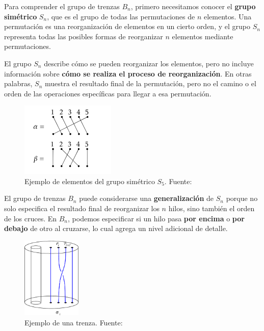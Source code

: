 Para comprender el grupo de trenzas \( B_n \), primero necesitamos conocer el \textbf{grupo simétrico} \( S_n \), que es el grupo de todas las permutaciones de \( n \) elementos. Una permutación es una reorganización de elementos en un cierto orden, y el grupo \( S_n \) representa todas las posibles formas de reorganizar \( n \) elementos mediante permutaciones.

El grupo \( S_n \) describe cómo se pueden reorganizar los elementos, pero no incluye información sobre \textbf{cómo se realiza el proceso de reorganización}. En otras palabras, \( S_n \) muestra el resultado final de la permutación, pero no el camino o el orden de las operaciones específicas para llegar a esa permutación.

\begin{figure}[h!]
    \centering
    \includegraphics[width=0.4\textwidth]{figures/chapters/1_def_grupo/symmetric_group.png}
    \caption{Ejemplo de elementos del grupo simétrico $S_5$. Fuente: \cite{ernst_43_2022}}
    \label{fig:ciclo_5}
\end{figure}

\bigskip

El grupo de trenzas \( B_n \) puede considerarse una \textbf{generalización} de \( S_n \) porque no solo especifica el resultado final de reorganizar los \( n \) hilos, sino también el orden de los cruces. En \( B_n \), podemos especificar si un hilo pasa \textbf{por encima} o \textbf{por debajo} de otro al cruzarse, lo cual agrega un nivel adicional de detalle.

\begin{figure}[h!]
    \centering
    \includegraphics[width=0.25\textwidth]{figures/chapters/1_def_grupo/op_braid.png}
    \caption{Ejemplo de una trenza. Fuente: \cite{vershinin_about_2014}}
    \label{fig:operacion_simple_trenza}
\end{figure}

